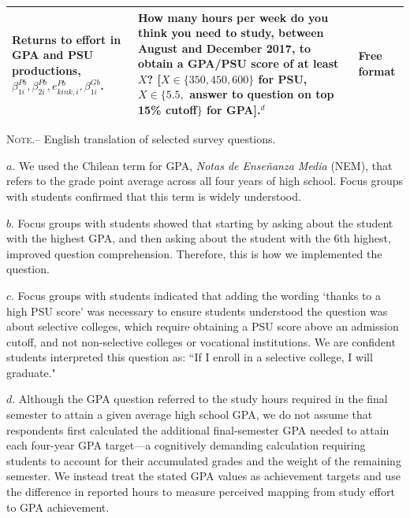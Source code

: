 \begin{table}[H]
\begin{tabularx}{\linewidth}{ X X X }
       Returns to effort in GPA and PSU productions, $\beta^{Pb}_{1i}, \beta^{Pb}_{2i}, e^{Pb}_{kink,i}, \beta^{Gb}_{1i}$. & How many hours per week do you think you need to study, between August and December 2017, to obtain a GPA/PSU score of at least $X$? [$X\in\{350, 450, 600\}$ for PSU, $X\in\{5.5,$ answer to question on top 15\% cutoff$\}$ for GPA].$^{d}$  & Free format \\ 
        \hline
   
\end{tabularx}
\begin{tablenotes}\singlespacing
\item
\scriptsize
\vspace{-10pt}
\noindent \textsc{ Note.--} English translation of selected survey questions.\par
\noindent $a$. We used the Chilean term for GPA, {\itshape Notas de Ense\~nanza Media} (NEM), that refers to the grade point average across all four years of high school. Focus groups with students confirmed that this term is widely understood.\par 
\noindent $b$. Focus groups with students showed that starting by asking about the student with the highest GPA, and then asking about the student with the 6th highest, improved question comprehension. Therefore, this is how we implemented the question.\par 
\noindent $c$. Focus groups with students indicated that adding the wording `thanks to a high PSU score' was necessary to ensure students understood the question was about selective colleges, which require obtaining a PSU score above an admission cutoff, and not non-selective colleges or vocational institutions. We are confident students interpreted this question as: ``If I enroll in a selective college, I will graduate."\par 
\noindent $d$. Although the GPA question referred to the study hours required in the final semester to attain a given average high school GPA, we do not assume that respondents first calculated the additional final-semester GPA needed to attain each four-year GPA target—a cognitively demanding calculation requiring students to account for their accumulated grades and the weight of the remaining semester. We instead treat the stated GPA values as achievement targets and use the difference in reported hours to measure perceived mapping from study effort to GPA achievement.

\end{tablenotes}
\end{table}

